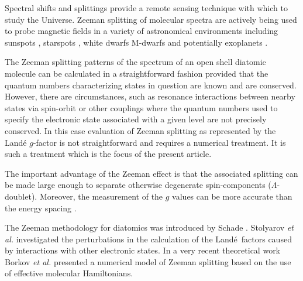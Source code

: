 \documentclass[preprint,review,12pt]{elsarticle}
\newcommand{\2}{$_{2}$}
\newcommand{\3}{$_{3}$}
\newcommand{\4}{$_{4}$}
\newcommand{\8}{$^{18}$}
\newcommand{\6}{$^{16}$}
\newcommand{\7}{$^{17}$}
\newcommand{\lande}{Land\'e}
\begin{document}
Spectral shifts and splittings provide a remote sensing technique with
which to study the Universe. Zeeman splitting of molecular spectra are
actively being used to probe magnetic fields in a variety of
astronomical environments including sunspots
\cite{00BeFrSo.TiO,01BeSoxx.OH,Sunspot_measurement_problem}, starspots
\cite{15AfBexx}, white dwarfs \cite{Zeeman_In_White_Dwarfs,15FeDeGa}
M-dwarfs \cite{10ShReWe.FeH} and potentially exoplanets
\cite{Zeeman_exoplanets_velocity}.

The Zeeman splitting patterns of the spectrum of an open shell diatomic
molecule can be calculated in a straightforward fashion provided
that the quantum numbers characterizing states in question are known
and are conserved. However, there are circumstances, such as resonance
interactions between nearby states via spin-orbit or other couplings where the quantum numbers used to specify the
electronic state
associated with a given level are not precisely conserved. In this
case evaluation of Zeeman splitting as represented by the Land\'e $g$-factor
is not straightforward and requires a numerical treatment. It is such a
treatment which is the focus of the present article.

The important advantage of the Zeeman effect is that the associated
splitting can be made large enough to separate otherwise degenerate
spin-components ($\Lambda$-doublet). Moreover, the measurement of the $g$
values can be more accurate than the energy spacing
\citep{90GrLiFi.NiH}.

The Zeeman methodology for diatomics was introduced by Schade
\cite{78Schade.methods}.  Stolyarov {\it et al.}  \cite{92StKlTa.Na2}
investigated the perturbations in the calculation of the \lande\
factors caused by interactions with other electronic states. In a very recent theoretical work Borkov {\it et al.}
\cite{16BoSuKl.NO}
presented a numerical model of Zeeman splitting based on the
use of effective molecular Hamiltonians.



\end{document}
